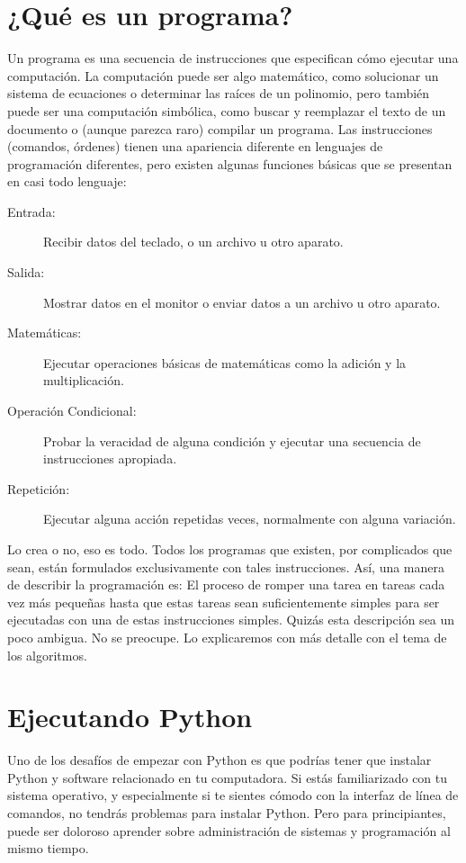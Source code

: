 \section{¿Qué es un programa?}
Un programa es una secuencia de instrucciones que especifican cómo ejecutar
una computación. La computación puede ser algo matemático, como solucionar
un sistema de ecuaciones o determinar las raíces de un polinomio, pero también
puede ser una computación simbólica, como buscar y reemplazar el texto de un
documento o (aunque parezca raro) compilar un programa.
Las instrucciones (comandos, órdenes) tienen una apariencia diferente en lenguajes de programación diferentes, pero existen algunas funciones básicas que
se presentan en casi todo lenguaje:
\begin{description}
    \item[Entrada: ] Recibir datos del teclado, o un archivo u otro aparato.
    \item[Salida:] Mostrar datos en el monitor o enviar datos a un archivo u otro aparato.
    \item[Matemáticas:] Ejecutar operaciones básicas de matemáticas como la adición y la multiplicación.
    \item[Operación Condicional:] Probar la veracidad de alguna condición y ejecutar una secuencia de instrucciones apropiada.
    \item[Repetición:] Ejecutar alguna acción repetidas veces, normalmente con alguna variación.
\end{description}
Lo crea o no, eso es todo. Todos los programas que existen, por complicados que
sean, están formulados exclusivamente con tales instrucciones. Así, una manera
de describir la programación es: El proceso de romper una tarea en tareas cada
vez más pequeñas hasta que estas tareas sean suficientemente simples para ser
ejecutadas con una de estas instrucciones simples.
Quizás esta descripción sea un poco ambigua. No se preocupe. Lo explicaremos
con más detalle con el tema de los algoritmos.

\section{Ejecutando Python}
Uno de los desafíos de empezar con Python es que podrías tener que instalar Python y software relacionado en tu computadora. Si estás familiarizado con tu sistema operativo, y especialmente si te sientes cómodo con la interfaz de línea de comandos, no tendrás problemas para instalar Python. Pero para principiantes, puede ser doloroso aprender sobre administración de sistemas y programación al mismo tiempo.


